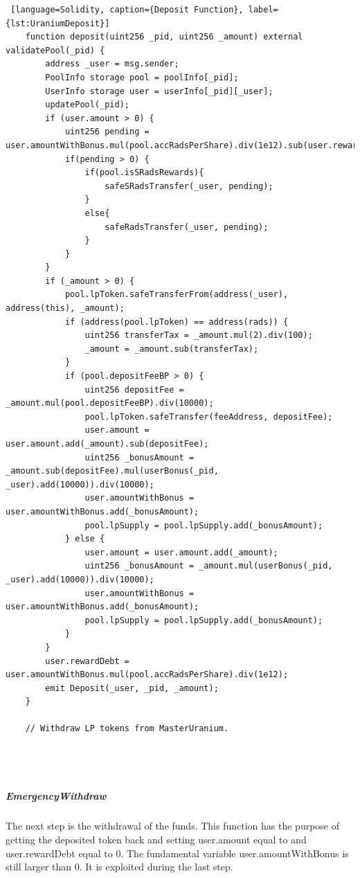\begin{lstlisting} [language=Solidity, caption={Deposit Function}, label={lst:UraniumDeposit}]
    function deposit(uint256 _pid, uint256 _amount) external validatePool(_pid) {
        address _user = msg.sender;
        PoolInfo storage pool = poolInfo[_pid];
        UserInfo storage user = userInfo[_pid][_user];
        updatePool(_pid);
        if (user.amount > 0) {
            uint256 pending = user.amountWithBonus.mul(pool.accRadsPerShare).div(1e12).sub(user.rewardDebt);
            if(pending > 0) {
                if(pool.isSRadsRewards){
                    safeSRadsTransfer(_user, pending);
                }
                else{
                    safeRadsTransfer(_user, pending);
                }
            }
        }
        if (_amount > 0) {
            pool.lpToken.safeTransferFrom(address(_user), address(this), _amount);
            if (address(pool.lpToken) == address(rads)) {
                uint256 transferTax = _amount.mul(2).div(100);
                _amount = _amount.sub(transferTax);
            }
            if (pool.depositFeeBP > 0) {
                uint256 depositFee = _amount.mul(pool.depositFeeBP).div(10000);
                pool.lpToken.safeTransfer(feeAddress, depositFee);
                user.amount = user.amount.add(_amount).sub(depositFee);
                uint256 _bonusAmount = _amount.sub(depositFee).mul(userBonus(_pid, _user).add(10000)).div(10000);
                user.amountWithBonus = user.amountWithBonus.add(_bonusAmount);
                pool.lpSupply = pool.lpSupply.add(_bonusAmount);
            } else {
                user.amount = user.amount.add(_amount);
                uint256 _bonusAmount = _amount.mul(userBonus(_pid, _user).add(10000)).div(10000);
                user.amountWithBonus = user.amountWithBonus.add(_bonusAmount);
                pool.lpSupply = pool.lpSupply.add(_bonusAmount);
            }
        }
        user.rewardDebt = user.amountWithBonus.mul(pool.accRadsPerShare).div(1e12);
        emit Deposit(_user, _pid, _amount);
    }

    // Withdraw LP tokens from MasterUranium.




\end{lstlisting} 

\subparagraph{EmergencyWithdraw} 
The next step is the withdrawal of the funds. 
This function has the purpose of getting the deposited token back and setting user.amount equal to and user.rewardDebt equal to 0.
The fundamental variable user.amountWithBonus is still larger than 0. It is exploited during the last step.

